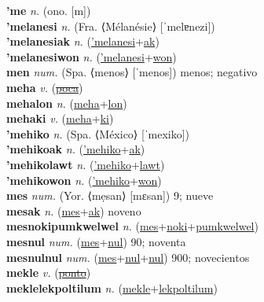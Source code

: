 \textbf{'me} \textit{n.} (ono. [m])
 \label{'me} \\
\textbf{'melanesi} \textit{n.} (Fra. ⟨Mélanésie⟩ [ˈmelɐnezi])
 \label{'melanesi} \\
\textbf{'melanesiak} \textit{n.} (\hyperref['melanesi]{'melanesi}+\hyperref[ak]{ak})
 \label{'melanesiak} \\
\textbf{'melanesiwon} \textit{n.} (\hyperref['melanesi]{'melanesi}+\hyperref[won]{won})
 \label{'melanesiwon} \\
\textbf{men} \textit{num.} (Spa. ⟨menos⟩ [ˈmenos])
menos; negativo \label{men} \\
\textbf{meha} \textit{v.} (\hyperref[poca]{\sout{poca}})
 \label{meha} \\
\textbf{mehalon} \textit{n.} (\hyperref[meha]{meha}+\hyperref[lon]{lon})
 \label{mehalon} \\
\textbf{mehaki} \textit{v.} (\hyperref[meha]{meha}+\hyperref[ki]{ki})
 \label{mehaki} \\
\textbf{'mehiko} \textit{n.} (Spa. ⟨México⟩ [ˈmexiko])
 \label{'mehiko} \\
\textbf{'mehikoak} \textit{n.} (\hyperref['mehiko]{'mehiko}+\hyperref[ak]{ak})
 \label{'mehikoak} \\
\textbf{'mehikolawt} \textit{n.} (\hyperref['mehiko]{'mehiko}+\hyperref[lawt]{lawt})
 \label{'mehikolawt} \\
\textbf{'mehikowon} \textit{n.} (\hyperref['mehiko]{'mehiko}+\hyperref[won]{won})
 \label{'mehikowon} \\
\textbf{mes} \textit{num.} (Yor. ⟨mẹsan⟩ [mɛsan])
9; nueve \label{mes} \\
\textbf{mesak} \textit{n.} (\hyperref[mes]{mes}+\hyperref[ak]{ak})
noveno \label{mesak} \\
\textbf{mesnokipumkwelwel} \textit{n.} (\hyperref[mes]{mes}+\hyperref[noki]{noki}+\hyperref[pumkwelwel]{pumkwelwel})
 \label{mesnokipumkwelwel} \\
\textbf{mesnul} \textit{num.} (\hyperref[mes]{mes}+\hyperref[nul]{nul})
90; noventa \label{mesnul} \\
\textbf{mesnulnul} \textit{num.} (\hyperref[mes]{mes}+\hyperref[nul]{nul}+\hyperref[nul]{nul})
900; novecientos \label{mesnulnul} \\
\textbf{mekle} \textit{v.} (\hyperref[ponto]{\sout{ponto}})
 \label{mekle} \\
\textbf{meklelekpoltilum} \textit{n.} (\hyperref[mekle]{mekle}+\hyperref[lekpoltilum]{lekpoltilum})
 \label{meklelekpoltilum} \\
